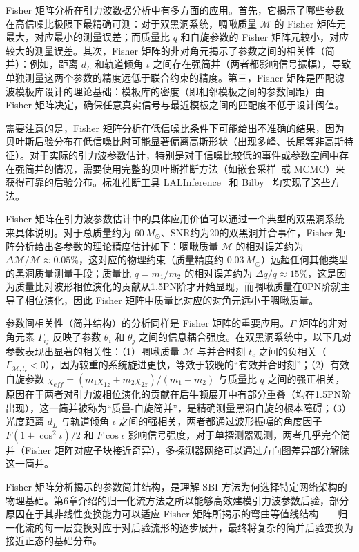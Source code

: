 Fisher 矩阵分析在引力波数据分析中有多方面的应用。首先，它揭示了哪些参数在高信噪比极限下最精确可测：对于双黑洞系统，啁啾质量 $\mathcal{M}$ 的 Fisher 矩阵元最大，对应最小的测量误差；而质量比 $q$ 和自旋参数的 Fisher 矩阵元较小，对应较大的测量误差。其次，Fisher 矩阵的非对角元揭示了参数之间的相关性（简并）：例如，距离 $d_L$ 和轨道倾角 $\iota$ 之间存在强简并（两者都影响信号振幅），导致单独测量这两个参数的精度远低于联合约束的精度。第三，Fisher 矩阵是匹配滤波模板库设计的理论基础：模板库的密度（即相邻模板之间的参数间距）由 Fisher 矩阵决定，确保任意真实信号与最近模板之间的匹配度不低于设计阈值。

需要注意的是，Fisher 矩阵分析在低信噪比条件下可能给出不准确的结果，因为贝叶斯后验分布在低信噪比时可能显著偏离高斯形状（出现多峰、长尾等非高斯特征）。对于实际的引力波参数估计，特别是对于信噪比较低的事件或参数空间中存在强简并的情况，需要使用完整的贝叶斯推断方法（如嵌套采样~\cite{Skilling2006nested}或 MCMC）来获得可靠的后验分布。标准推断工具 LALInference~\cite{Veitch2015LALInference} 和 Bilby~\cite{Ashton2019Bilby} 均实现了这些方法。

Fisher 矩阵在引力波参数估计中的具体应用价值可以通过一个典型的双黑洞系统来具体说明。对于总质量约为 $60\,M_\odot$、SNR约为20的双黑洞并合事件，Fisher 矩阵分析给出各参数的理论精度估计如下：啁啾质量 $\mathcal{M}$ 的相对误差约为 $\Delta\mathcal{M}/\mathcal{M} \approx 0.05\%$，这对应的物理约束（质量精度约 $0.03\,M_\odot$）远超任何其他类型的黑洞质量测量手段；质量比 $q = m_1/m_2$ 的相对误差约为 $\Delta q/q \approx 15\%$，这是因为质量比对波形相位演化的贡献从1.5PN阶才开始显现，而啁啾质量在0PN阶就主导了相位演化，因此 Fisher 矩阵中质量比对应的对角元远小于啁啾质量。

参数间相关性（简并结构）的分析同样是 Fisher 矩阵的重要应用。$\Gamma$ 矩阵的非对角元素 $\Gamma_{ij}$ 反映了参数 $\theta_i$ 和 $\theta_j$ 之间的信息耦合强度。在双黑洞系统中，以下几对参数表现出显著的相关性：（1）啁啾质量 $\mathcal{M}$ 与并合时刻 $t_c$ 之间的负相关（$\Gamma_{\mathcal{M},t_c} < 0$），因为较重的系统旋进更快，等效于较晚的“有效并合时刻”；（2）有效自旋参数 $\chi_{eff} = (m_1\chi_{1z} + m_2\chi_{2z})/(m_1+m_2)$ 与质量比 $q$ 之间的强正相关，原因在于两者对引力波相位演化的贡献在后牛顿展开中有部分重叠（均在1.5PN阶出现），这一简并被称为“质量-自旋简并”，是精确测量黑洞自旋的根本障碍；（3）光度距离 $d_L$ 与轨道倾角 $\iota$ 之间的强相关，两者都通过波形振幅的角度因子 $F(1+\cos^2\iota)/2$ 和 $F\cos\iota$ 影响信号强度，对于单探测器观测，两者几乎完全简并（Fisher 矩阵对应子块接近奇异），多探测器网络可以通过方向图差异部分解除这一简并。

Fisher 矩阵分析揭示的参数简并结构，是理解 SBI 方法为何选择特定网络架构的物理基础。第6章介绍的归一化流方法之所以能够高效建模引力波参数后验，部分原因在于其非线性变换能力可以适应 Fisher 矩阵所揭示的弯曲等值线结构——归一化流的每一层变换对应于对后验流形的逐步展开，最终将复杂的简并后验变换为接近正态的基础分布。

